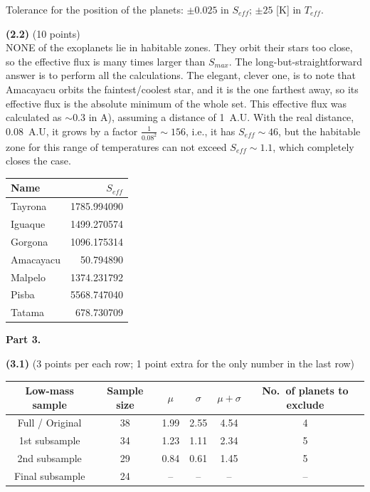Tolerance for the position of the planets: $\pm0.025$ in $S_{eff}$; $\pm25$
[K] in $T_{eff}$.

\medskip
\noindent\textbf{(2.2)} \hfill(10 points)\\
NONE of the exoplanets lie in habitable zones. They orbit their stars too
close, so the effective flux is many times larger than $S_{max}$. The
long-but-straightforward answer is to perform all the calculations. The
elegant, clever one, is to note that Amacayacu orbits the faintest/coolest
star, and it is the one farthest away, so its effective flux is the absolute
minimum of the whole set. This effective flux was calculated as ${\sim}0.3$
in A), assuming a distance of 1~A.U. With the real distance, 0.08~A.U, it
grows by a factor $\frac{1}{0.08^2}\sim156$, i.e., it has
$S_{eff}\sim46$, but the habitable zone for this range of temperatures can
not exceed $S_{eff}\sim1.1$, which completely closes the case.

\begin{center}
\begin{tabular}{lr}
\toprule
Name & $S_{eff}$\\
\midrule
Tayrona & 1785.994090\\
Iguaque & 1499.270574\\
Gorgona & 1096.175314\\
Amacayacu & 50.794890\\
Malpelo & 1374.231792\\
Pisba & 5568.747040\\
Tatama & 678.730709\\
\bottomrule
\end{tabular}
\end{center}

\medskip
\noindent\textbf{Part 3.}

\noindent\textbf{(3.1)} (3 points per each row; 1 point extra for the only
number in the last row)

\begin{center}
\begin{tabular}{cccccc}
\toprule
Low-mass sample & Sample size & $\mu$ & $\sigma$ & $\mu+\sigma$
  & No.\ of planets to exclude\\
\midrule
Full / Original & 38 & 1.99 & 2.55 & 4.54 & 4\\
1st subsample & 34 & 1.23 & 1.11 & 2.34 & 5\\
2nd subsample & 29 & 0.84 & 0.61 & 1.45 & 5\\
Final subsample & 24 & -- & -- & -- & --\\
\bottomrule
\end{tabular}
\end{center}


